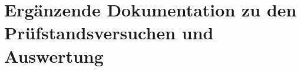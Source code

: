 \chapter[head={Ergänzung zu Versuchen \& Auswertung}]{Ergänzende Dokumentation zu den Prüfstandsversuchen und Auswertung}
\label{appchap:suppl_illustrations_evaluation}

\lipsum[1]



